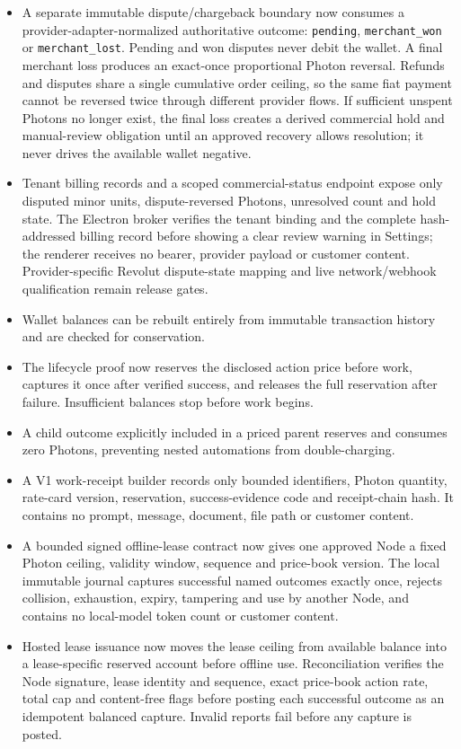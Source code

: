 \documentclass[11pt]{article}
\newcommand{\code}[1]{\texttt{#1}}
\begin{document}
\begin{itemize}
  \item A separate immutable dispute/chargeback boundary now consumes a provider-adapter-normalized authoritative outcome: \code{pending}, \code{merchant\_won} or \code{merchant\_lost}. Pending and won disputes never debit the wallet. A final merchant loss produces an exact-once proportional Photon reversal. Refunds and disputes share a single cumulative order ceiling, so the same fiat payment cannot be reversed twice through different provider flows. If sufficient unspent Photons no longer exist, the final loss creates a derived commercial hold and manual-review obligation until an approved recovery allows resolution; it never drives the available wallet negative.
  \item Tenant billing records and a scoped commercial-status endpoint expose only disputed minor units, dispute-reversed Photons, unresolved count and hold state. The Electron broker verifies the tenant binding and the complete hash-addressed billing record before showing a clear review warning in Settings; the renderer receives no bearer, provider payload or customer content. Provider-specific Revolut dispute-state mapping and live network/webhook qualification remain release gates.
  \item Wallet balances can be rebuilt entirely from immutable transaction history and are checked for conservation.
  \item The lifecycle proof now reserves the disclosed action price before work, captures it once after verified success, and releases the full reservation after failure. Insufficient balances stop before work begins.
  \item A child outcome explicitly included in a priced parent reserves and consumes zero Photons, preventing nested automations from double-charging.
  \item A V1 work-receipt builder records only bounded identifiers, Photon quantity, rate-card version, reservation, success-evidence code and receipt-chain hash. It contains no prompt, message, document, file path or customer content.
  \item A bounded signed offline-lease contract now gives one approved Node a fixed Photon ceiling, validity window, sequence and price-book version. The local immutable journal captures successful named outcomes exactly once, rejects collision, exhaustion, expiry, tampering and use by another Node, and contains no local-model token count or customer content.
  \item Hosted lease issuance now moves the lease ceiling from available balance into a lease-specific reserved account before offline use. Reconciliation verifies the Node signature, lease identity and sequence, exact price-book action rate, total cap and content-free flags before posting each successful outcome as an idempotent balanced capture. Invalid reports fail before any capture is posted.

\end{itemize}
\end{document}
